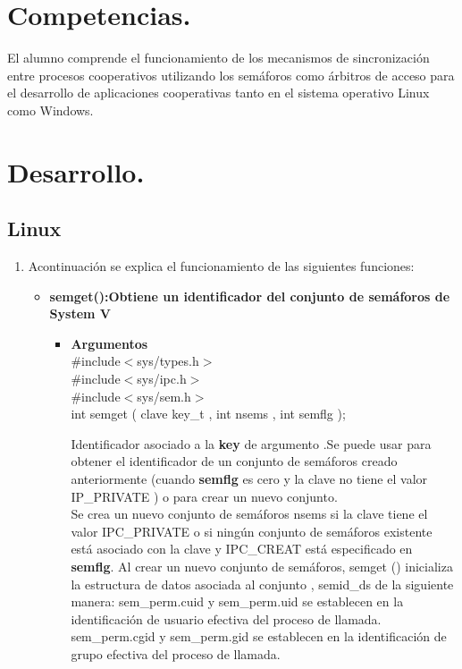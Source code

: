 \documentclass[12pt]{article}
\begin{document}
\section{Competencias.}
El alumno comprende el funcionamiento de los mecanismos de sincronización entre procesos cooperativos utilizando los semáforos como árbitros de acceso para el desarrollo de aplicaciones cooperativas tanto en el sistema operativo Linux como Windows.
\section{Desarrollo.}
    \subsection{Linux}
    \begin{enumerate}
        \item Acontinuación se explica el funcionamiento de las siguientes funciones: 
        \begin{itemize}
            \item \textbf{semget():Obtiene un identificador del conjunto de semáforos de System V}\\
            \begin{itemize}
                 \item \textbf{Argumentos}\\
                    #include$<$sys/types.h$>$ \\
                    #include$<$sys/ipc.h$>$ \\
                    #include$<$sys/sem.h$>$ \\
                    int semget ( clave key\_t , int nsems , int semflg );\\
                    \begin{itemize}
                         Identificador asociado a la \textbf{key} de argumento .Se puede usar para obtener el identificador de un conjunto de semáforos creado anteriormente (cuando \textbf{semflg} es cero y la clave no tiene el valor IP\_PRIVATE ) o para crear un nuevo conjunto. \\
                         Se crea un nuevo conjunto de semáforos nsems si la clave tiene el valor IPC\_PRIVATE o si ningún conjunto de semáforos existente está asociado con la clave y IPC\_CREAT está especificado en \textbf{semflg}.
                        Al crear un nuevo conjunto de semáforos, semget () inicializa la estructura de datos asociada al conjunto , semid\_ds de la siguiente manera: sem\_perm.cuid y sem\_perm.uid se establecen en la identificación de usuario efectiva del proceso de llamada. sem\_perm.cgid y sem\_perm.gid se establecen en la identificación de grupo efectiva del proceso de llamada.


\end{itemize}
\end{itemize}
\end{itemize}
\end{enumerate}
\end{document}
